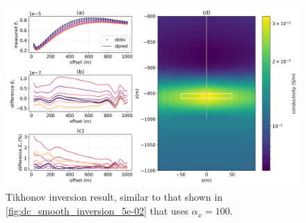 \begin{figure}
    \begin{center}
    \includegraphics[width=1\textwidth]{figures/inversion/dc_smooth_inversion_5e-02_alpha_100.png}
    \end{center}
\caption{
    Tikhonov inversion result, similar to that shown in \ref{fig:dc_smooth_inversion_5e-02}
    that uses $\alpha_x = 100$.
}
\label{fig:dc_smooth_inversion_5e-02_alpha_100}
\end{figure}
